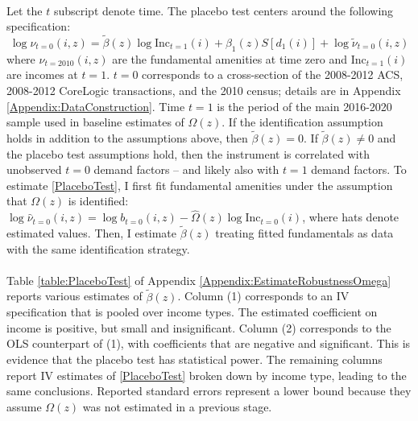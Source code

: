 \documentclass[12pt]{article}
\begin{document}
\paragraph*{}
Let the $t$ subscript denote time. The placebo test centers around the following specification:
\begin{equation}\label{PlaceboTest}
 	\log \nu_{t = 0}(i, z) =  \tilde{\beta}(z)\log\text{Inc}_{t = 1}(i) + \beta_{1}(z)S[d_{1}(i)] + \log \tilde{\nu}_{t = 0}(i, z)
\end{equation}
where $\nu_{t = 2010}(i, z)$ are the fundamental amenities at time zero and $\text{Inc}_{t = 1}(i)$ are incomes at $t = 1$. $t = 0$ corresponds to a cross-section of the 2008-2012 ACS, 2008-2012 CoreLogic transactions, and the 2010 census; details are in Appendix \ref{Appendix:DataConstruction}. Time $t = 1$ is the period of the main 2016-2020 sample used in baseline estimates of $\Omega(z)$. If the identification assumption holds in addition to the assumptions above, then  $\tilde{\beta}(z) = 0$. If $\tilde{\beta}(z) \neq 0$ and the placebo test assumptions hold, then the instrument is correlated with unobserved $t = 0$ demand factors -- and likely also with $t=1$ demand factors.   To estimate \eqref{PlaceboTest}, I first fit fundamental amenities under the assumption that $\Omega(z)$ is identified: $\log \hat{\nu}_{t = 0}(i, z) = \log b_{t = 0}(i, z) - \hat{\Omega}(z)\log \text{Inc}_{t = 0}(i)$, where hats denote estimated values. Then, I estimate $\tilde{\beta}(z)$ treating fitted fundamentals as data with the same identification strategy. 

\paragraph*{}
Table \ref{table:PlaceboTest} of Appendix \ref{Appendix:EstimateRobustnessOmega} reports various estimates of $\tilde{\beta}(z)$. Column (1) corresponds to an IV specification that is pooled over income types. The estimated coefficient on income is positive, but small and insignificant. Column (2) corresponds to the OLS counterpart of (1), with coefficients that are negative and significant. This is evidence that the placebo test has statistical power. The remaining columns report IV estimates of \eqref{PlaceboTest} broken down by income type, leading to the same conclusions. Reported standard errors represent a lower bound because they assume $\Omega(z)$ was not estimated in a previous stage. 


\end{document}
